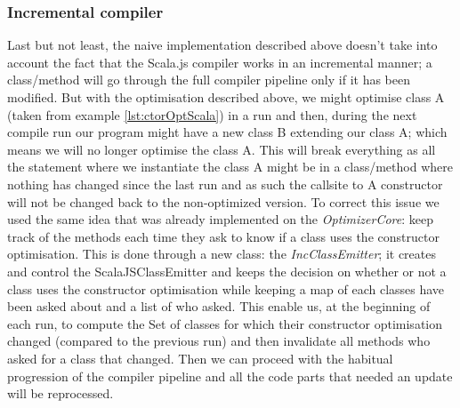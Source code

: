 \subsubsection{Incremental compiler}
Last but not least, the naive implementation described above doesn't take into
account the fact that the Scala.js compiler works in an incremental manner; a
class/method will go through the full compiler pipeline only if it has been
modified. But with the optimisation described above, we might optimise class A
(taken from example \ref{lst:ctorOptScala}) in a run and then, during the next
compile run our program might have a new class B extending our class A; which
means we will no longer optimise the class A. This will break everything as all
the statement where we instantiate the class A might be in a class/method where
nothing has changed since the last run and as such the callsite to A
constructor will not be changed back to the non-optimized version.
To correct this issue we used the same idea that was already implemented on the
\emph{OptimizerCore}: keep track of the methods each time they ask to know if a
class uses the constructor optimisation. This is done through a new class: the
\emph{IncClassEmitter}; it creates and control the ScalaJSClassEmitter and
keeps the decision on whether or not a class uses the constructor optimisation
while keeping a map of each classes have been asked about and a list of who
asked. This enable us, at the beginning of each run, to compute the Set of
classes for which their constructor optimisation changed (compared to the
previous run) and then invalidate all methods who asked for a class that
changed. Then we can proceed with the habitual progression of the compiler
pipeline and all the code parts that needed an update will be reprocessed.
